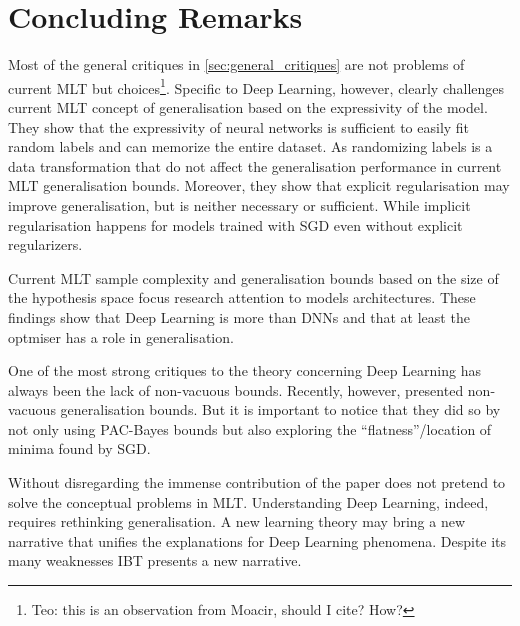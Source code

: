 \section{Concluding Remarks}
Most of the general critiques in \cref{sec:general_critiques} are not problems of current \ac{MLT} but choices\footnote{Teo: this is an observation from Moacir, should I cite? How?}.
Specific to Deep Learning, however, \citeauthor{zhang:2016} clearly challenges current \ac{MLT} concept of generalisation based on the expressivity of the model\cite{zhang:2016}.  They show that the expressivity of neural networks is sufficient to easily fit random labels and can memorize the entire dataset. As randomizing labels is a data transformation that do not affect the generalisation performance in current \ac{MLT} generalisation bounds. Moreover, they show that explicit regularisation may improve generalisation, but is neither necessary or sufficient. While implicit regularisation happens for models trained with SGD even without explicit regularizers.

Current \ac{MLT} sample complexity and generalisation bounds based on the size of the hypothesis space focus research attention to models architectures. These findings show that Deep Learning is more than \acp{DNN} and that at least the optmiser has a role in generalisation.

One of the most strong critiques to the theory concerning Deep Learning has always been the lack of non-vacuous bounds. Recently, however, \cite{dziugaite:2017} presented non-vacuous generalisation bounds. But it is important to notice that they did so by not only using PAC-Bayes bounds but also exploring the ``flatness''/location of minima found by SGD.

Without disregarding the immense contribution of \cite{dziugaite:2017} the paper does not pretend to solve the conceptual problems in \ac{MLT}. Understanding Deep Learning, indeed, requires rethinking generalisation. A new learning theory may bring a new narrative that unifies the explanations for Deep Learning phenomena. Despite its many weaknesses \acf*{IBT} presents a new narrative.


%

